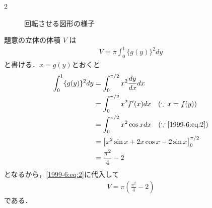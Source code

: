 \documentclass[../../../../main.tex]{subfiles}
\begin{document}
\begin{multicols}{2}
\begin{figure}[H]
        \caption{回転させる図形の様子}
        \label{1999-6:fig:1}
    \end{figure}

    題意の立体の体積 $V$ は
    \begin{align}
        V = \pi \int_{0}^{1} \{g(y)\}^2 dy \label{1999-6:eq:2}
    \end{align}
    と書ける．$x=g(y)$とおくと
    \begin{align}
        \int_{0}^{1} \{g(y)\}^2 dy
         & = \int_{0}^{\pi/2} x^2 \frac{dy}{dx} dx                              \\
         & = \int_{0}^{\pi/2} x^2 f'(x) dx \quad (\because x=f(y))              \\
         & = \int_{0}^{\pi/2} x^2 \cos x dx \quad (\because \cref{1999-6:eq:2}) \\
         & = \left[ x^2 \sin x + 2x \cos x - 2\sin x \right]_{0}^{\pi/2}        \\
         & = \frac{\pi^2}{4} - 2
    \end{align}
    となるから，\cref{1999-6:eq:2}に代入して
    \begin{align}
        V = \pi \left(\frac{\pi^2}{4} - 2\right) \label{1999-6:eq:3}
    \end{align}
    である．


\end{multicols}
\end{document}
